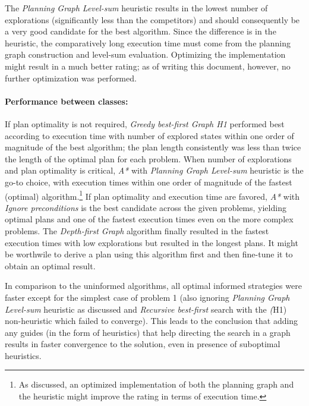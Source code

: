 \documentclass[12pt, a4paper, oneside]{article}
\begin{document}
The \textit{Planning Graph Level-sum} heuristic results in the lowest number
of explorations (significantly less than the competitors) 
and should consequently be a very good candidate for the best algorithm.
Since the difference is in the heuristic, the comparatively long execution time 
must come from the planning graph construction and level-sum evaluation. 
Optimizing the implementation might result in a much better rating;
as of writing this document, however, no further optimization was performed.

\paragraph{Performance between classes:} If plan optimality is not required,
\textit{Greedy best-first Graph H1} performed best according to execution time
with number of explored states within one order of magnitude of the best 
algorithm; the plan length consistently was less than twice the length of the
optimal plan for each problem.
When number of explorations and plan optimality is critical, \textit{A*} with \textit{Planning Graph Level-sum} heuristic is the go-to choice, with
execution times within one order of magnitude of the fastest (optimal) algorithm.\footnote{As discussed, an optimized implementation of both the planning graph
and the heuristic might improve the rating in terms of execution time.}
If plan optimality and execution time are favored, \textit{A*} with \textit{Ignore preconditions} is the best candidate across the given problems, yielding optimal
plans and one of the fastest execution times even on the more complex problems.
The \textit{Depth-first Graph} algorithm finally resulted in the fastest execution
times with low explorations but resulted in the longest plans.
It might be worthwile to derive a plan using this algorithm first and then fine-tune
it to obtain an optimal result.

In comparison to the uninformed algorithms, all optimal informed strategies
were faster except for the simplest case of problem 1 (also ignoring \textit{Planning Graph Level-sum} heuristic as discussed and \textit{Recursive best-first} search with the \textit(H1) non-heuristic which failed to converge).
This leads to the conclusion that adding any guides (in the form of heuristics) that help directing the search
in a graph results in faster convergence to the solution,
even in presence of suboptimal heuristics.

\pagebreak

      
\end{document}
